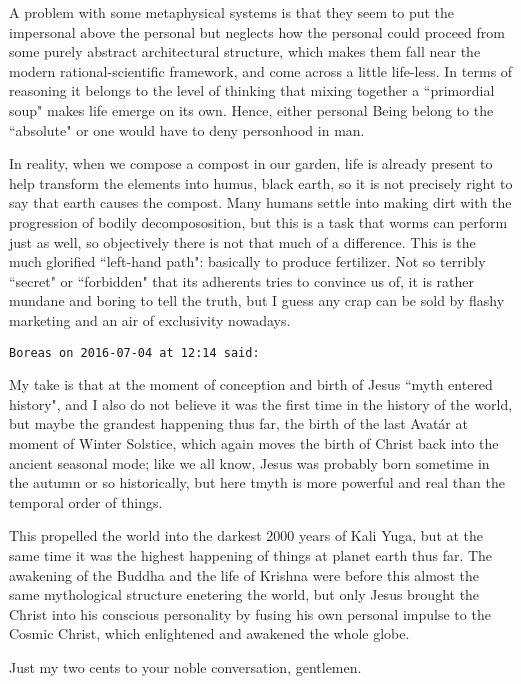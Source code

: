 \begin{footnotesize}
\begin{sffamily}
A problem with some metaphysical systems is that they seem to put the impersonal above the personal but neglects how the personal could proceed from some purely abstract architectural structure, which makes them fall near the modern rational-scientific framework, and come across a little life-less. In terms of reasoning it belongs to the level of thinking that mixing together a ``primordial soup" makes life emerge on its own. Hence, either personal Being belong to the ``absolute" or one would have to deny personhood in man.

In reality, when we compose a compost in our garden, life is already present to help transform the elements into humus, black earth, so it is not precisely right to say that earth causes the compost. Many humans settle into making dirt with the progression of bodily decompososition, but this is a task that worms can perform just as well, so objectively there is not that much of a difference. This is the much glorified ``left-hand path": basically to produce fertilizer. Not so terribly ``secret" or ``forbidden" that its adherents tries to convince us of, it is rather mundane and boring to tell the truth, but I guess any crap can be sold by flashy marketing and an air of exclusivity nowadays.


\hfill

\texttt{Boreas on 2016-07-04 at 12:14 said: }

My take is that at the moment of conception and birth of Jesus ``myth entered history", and I also do not believe it was the first time in the history of the world, but maybe the grandest happening thus far, the birth of the last Avatár at moment of Winter Solstice, which again moves the birth of Christ back into the ancient seasonal mode; like we all know, Jesus was probably born sometime in the autumn or so historically, but here tmyth is more powerful and real than the temporal order of things.

This propelled the world into the darkest 2000 years of Kali Yuga, but at the same time it was the highest happening of things at planet earth thus far. The awakening of the Buddha and the life of Krishna were before this almost the same mythological structure enetering the world, but only Jesus brought the Christ into his conscious personality by fusing his own personal impulse to the Cosmic Christ, which enlightened and awakened the whole globe.

Just my two cents to your noble conversation, gentlemen.


\end{sffamily}\end{footnotesize}
